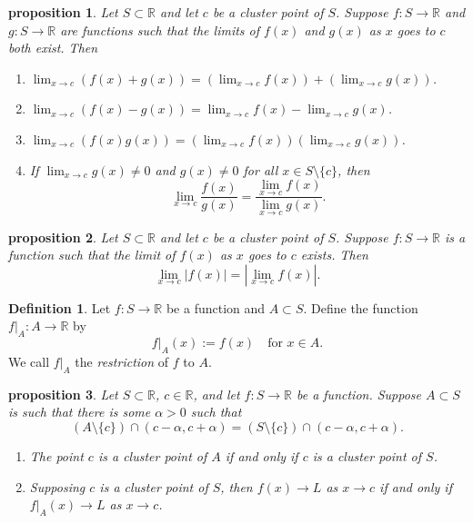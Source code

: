 \documentclass{article}
\newtheorem{proposition}{Proposition}[section]
\newtheorem{proposition}{proposition}[section]
\theoremstyle{definition}
\newtheorem{definition}{Definition}[section]
\theoremstyle{remark}
\begin{document}
\begin{proposition}
Let $S \subset \mathbb{R}$ and let $c$ be a cluster point of $S$. Suppose $f : S \to \mathbb{R}$ and $g : S \to \mathbb{R}$ are functions such that the limits of $f(x)$ and $g(x)$ as $x$ goes to $c$ both exist. Then
\begin{enumerate}
\item $\lim_{x\to c} (f(x) + g(x)) = \left(\lim_{x\to c} f(x)\right) + \left(\lim_{x\to c} g(x)\right)$.
\item $\lim_{x\to c} (f(x) - g(x)) = \lim_{x\to c} f(x) - \lim_{x\to c} g(x)$.
\item $\lim_{x\to c} (f(x)g(x)) = \left(\lim_{x\to c} f(x)\right) \left(\lim_{x\to c} g(x)\right)$.
\item If $\lim_{x\to c} g(x) \neq 0$ and $g(x) \neq 0$ for all $x \in S \setminus \{c\}$, then
\[
\lim_{x\to c} \frac{f(x)}{g(x)} = \frac{\lim_{x\to c} f(x)}{\lim_{x\to c} g(x)}.
\]
\end{enumerate}
\end{proposition}

\begin{proposition}
Let $S \subset \mathbb{R}$ and let $c$ be a cluster point of $S$. Suppose $f : S \to \mathbb{R}$ is a function such that the limit of $f(x)$ as $x$ goes to $c$ exists. Then
\[
\lim_{x\to c} |f(x)| = \left| \lim_{x\to c} f(x) \right|.
\]
\end{proposition}

\begin{definition}
Let $f : S \to \mathbb{R}$ be a function and $A \subset S$. Define the function $f|_A : A \to \mathbb{R}$ by
\[
f|_A(x) := f(x) \quad \text{for } x \in A.
\]
We call $f|_A$ the \textit{restriction} of $f$ to $A$.
\end{definition}

\begin{proposition}
Let $S \subset \mathbb{R}$, $c \in \mathbb{R}$, and let $f : S \to \mathbb{R}$ be a function. Suppose $A \subset S$ is such that there is some $\alpha > 0$ such that
\[
(A \setminus \{c\}) \cap (c - \alpha, c + \alpha) = (S \setminus \{c\}) \cap (c - \alpha, c + \alpha).
\]
\begin{enumerate}
\item The point $c$ is a cluster point of $A$ if and only if $c$ is a cluster point of $S$.
\item Supposing $c$ is a cluster point of $S$, then $f(x) \to L$ as $x \to c$ if and only if $f|_A(x) \to L$ as $x \to c$.
\end{enumerate}
\end{proposition}
\end{document}

